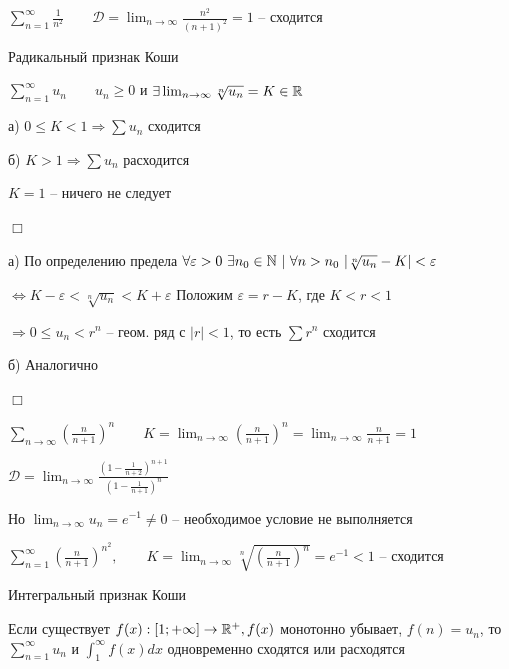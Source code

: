 \documentclass[12pt]{article}
\begin{document}
    $\sum_{n = 1}^\infty \frac{1}{n^2} \quad\quad \mathcal{D} = \lim_{n \to \infty} \frac{n^2}{(n + 1)^2} = 1$ -- сходится

    \hypertarget{cauchyradicalsign}{}

    \begin{MyTheorem}
         Радикальный признак Коши

        $\sum_{n = 1}^\infty u_n \quad\quad u_n \geq 0$ и $\exists \lim_{n \to \infty} \sqrt[n]{u_n} = K \in \mathbb{R}$

        а) $0 \leq K < 1 \Longrightarrow \sum u_n$ сходится

        б) $K > 1 \Longrightarrow \sum u_n$ расходится
    \end{MyTheorem}

    \Notas $K = 1$ -- ничего не следует

    \begin{MyProof}
        $\Box$

        а) По определению предела $\forall \varepsilon > 0 \ \exists n_0 \in \Natural \ | \ \forall n > n_0 \ |\sqrt[n]{u_n} - K| < \varepsilon$

        $\Longleftrightarrow K - \varepsilon < \sqrt[n]{u_n} < K + \varepsilon$ Положим $\varepsilon = r - K$, где $K < r < 1$

        $\Longrightarrow 0 \leq u_n < r^n$ -- геом. ряд с $|r| < 1$, то есть $\sum r^n$ сходится

        б) Аналогично

        $\Box$
    \end{MyProof}

     $\sum_{n \to \infty} \left(\frac{n}{n + 1}\right)^n \quad\quad K = \lim_{n \to \infty} \left(\frac{n}{n + 1}\right)^n = \lim_{n \to \infty} \frac{n}{n + 1} = 1$

    $\mathcal{D} = \lim_{n \to \infty} \frac{\left(1 - \frac{1}{n + 2}\right)^{n + 1}}{\left(1 - \frac{1}{n + 1}\right)^{n}}$

    Но $\lim_{n \to \infty} u_n = e^{-1} \neq 0$ -- необходимое условие не выполняется

     $\sum_{n = 1}^\infty \left(\frac{n}{n + 1}\right)^{n^2}, \quad\quad K = \lim_{n \to \infty} \sqrt[n]{\left(\frac{n}{n + 1}\right)^n} = e^{-1} < 1$ -- сходится

    \hypertarget{cauchyintegralsign}{}

    \begin{MyTheorem}
         Интегральный признак Коши

        Если существует $f(x) : [1; +\infty] \to \mathbb{R}^+, f(x)$ монотонно убывает, $f(n) = u_n$, то $\sum_{n = 1}^\infty u_n$ и $\int_{1}^\infty f(x) dx$ одновременно сходятся или расходятся
    \end{MyTheorem}
\end{document}
